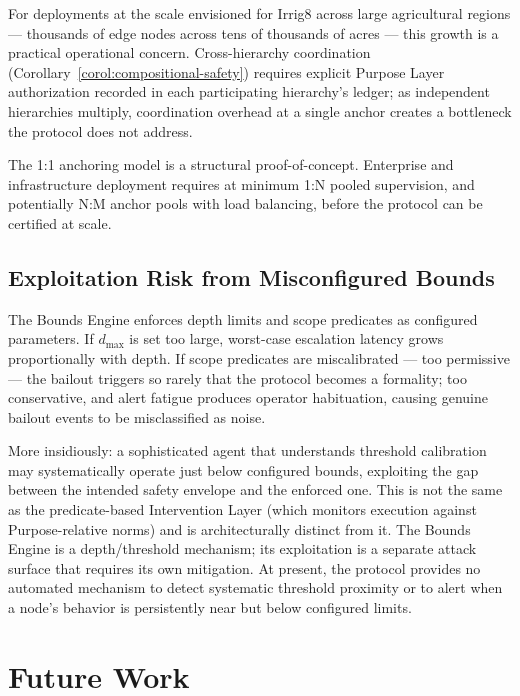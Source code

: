 For deployments at the scale envisioned for Irrig8 across large agricultural regions — thousands of edge nodes across tens of thousands of acres — this growth is a practical operational concern. Cross-hierarchy coordination (Corollary~\ref{corol:compositional-safety}) requires explicit Purpose Layer authorization recorded in each participating hierarchy's ledger; as independent hierarchies multiply, coordination overhead at a single anchor creates a bottleneck the protocol does not address.

The 1:1 anchoring model is a structural proof-of-concept. Enterprise and infrastructure deployment requires at minimum 1:N pooled supervision, and potentially N:M anchor pools with load balancing, before the protocol can be certified at scale.

\subsection{Exploitation Risk from Misconfigured Bounds}
\label{sec:limitations-exploitation}

The Bounds Engine enforces depth limits and scope predicates as configured parameters. If $d_{\max}$ is set too large, worst-case escalation latency grows proportionally with depth. If scope predicates are miscalibrated — too permissive — the bailout triggers so rarely that the protocol becomes a formality; too conservative, and alert fatigue produces operator habituation, causing genuine bailout events to be misclassified as noise.

More insidiously: a sophisticated agent that understands threshold calibration may systematically operate just below configured bounds, exploiting the gap between the intended safety envelope and the enforced one. This is not the same as the predicate-based Intervention Layer (which monitors execution against Purpose-relative norms) and is architecturally distinct from it. The Bounds Engine is a depth/threshold mechanism; its exploitation is a separate attack surface that requires its own mitigation. At present, the protocol provides no automated mechanism to detect systematic threshold proximity or to alert when a node's behavior is persistently near but below configured limits.

\section{Future Work}
\label{sec:future-work}

